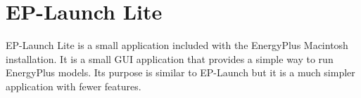 \section{EP-Launch Lite}\label{ep-launch-lite}

EP-Launch Lite is a small application included with the EnergyPlus Macintosh installation. It is a small GUI application that provides a simple way to run EnergyPlus models. Its purpose is similar to EP-Launch but it is a much simpler application with fewer features.
